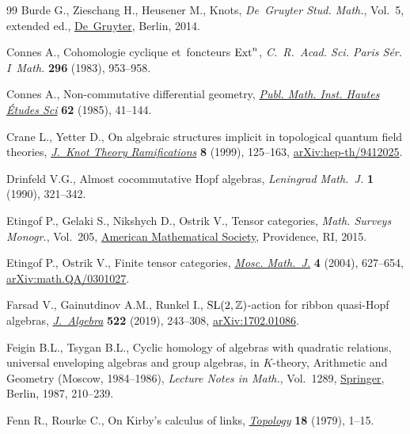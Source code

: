 \begin{thebibliography}{99}
Burde G., Zieschang H., Heusener M., Knots, \textit{De~Gruyter Stud. Math.},
 Vol.~5, {e}xtended ed.,
 \href{https://doi.org/10.1515/9783110270785}{De~Gruyter}, Berlin, 2014.

Connes A., Cohomologie cyclique et~foncteurs {${\rm Ext}^n$},
 \textit{C.~R.~Acad. Sci. Paris S\'er. I~Math.} \textbf{296} (1983), 953--958.

Connes A., Non-commutative differential geometry,
 \href{https://doi.org/10.1007/BF02698807}{\textit{Publ. Math. Inst. Hautes
 \'Etudes Sci}} \textbf{62} (1985), 41--144.

Crane L., Yetter D., On algebraic structures implicit in topological quantum
 field theories,
 \href{https://doi.org/10.1142/S0218216599000109}{\textit{J.~Knot Theory
 Ramifications}} \textbf{8} (1999), 125--163,
 \href{http://arxiv.org/abs/hep-th/9412025}{arXiv:hep-th/9412025}.

Drinfeld V.G., Almost cocommutative {H}opf algebras, \textit{Leningrad
 Math.~J.} \textbf{1} (1990), 321--342.

Etingof P., Gelaki S., Nikshych D., Ostrik V., Tensor categories, \textit{Math.
 Surveys Monogr.}, Vol.~205, \href{https://doi.org/10.1090/surv/205}{American
 Mathematical Society}, Providence, RI, 2015.

Etingof P., Ostrik V., Finite tensor categories,
 \href{https://doi.org/10.17323/1609-4514-2004-4-3-627-654}{\textit{Mosc.
 Math.~J.}} \textbf{4} (2004), 627--654,
 \href{http://arxiv.org/abs/math.QA/0301027}{arXiv:math.QA/0301027}.

Farsad V., Gainutdinov A.M., Runkel I., {${\rm SL}(2,\mathbb{Z})$}-action for
 ribbon quasi-{H}opf algebras,
 \href{https://doi.org/10.1016/j.jalgebra.2018.12.012}{\textit{J.~Algebra}}
 \textbf{522} (2019), 243--308,
 \href{http://arxiv.org/abs/1702.01086}{arXiv:1702.01086}.

Feigin B.L., Tsygan B.L., Cyclic homology of algebras with quadratic relations,
 universal enveloping algebras and group algebras, in {$K$}-theory, Arithmetic
 and Geometry ({M}oscow, 1984--1986), \textit{Lecture Notes in Math.}, Vol.~1289, \href{https://doi.org/10.1007/BFb0078369}{Springer}, Berlin, 1987,
 210--239.

Fenn R., Rourke C., On {K}irby's calculus of links,
 \href{https://doi.org/10.1016/0040-9383(79)90010-7}{\textit{Topology}}
 \textbf{18} (1979), 1--15.


\end{thebibliography}
